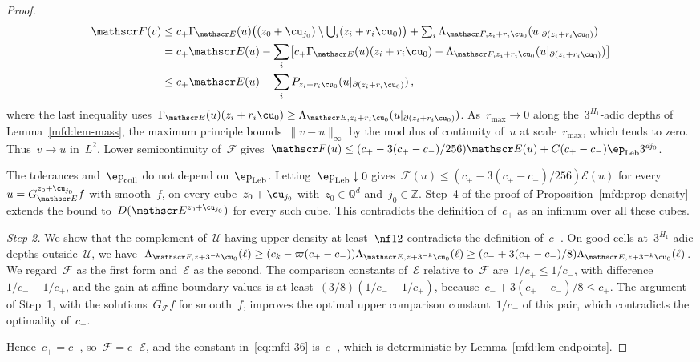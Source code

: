 \documentclass[11pt]{amsart}
\begin{document}
\begin{proof}
\begin{align*}
	\mathscr F(v)
	&\leq c_+\Gamma_{\mathscr E}(u)\bigl((z_0+\cu_{j_0})\setminus\textstyle\bigcup_i(z_i+r_i\cu_0)\bigr)+\sum_i\Lambda_{\mathscr F,z_i+r_i\cu_0}(u|_{\partial(z_i+r_i\cu_0)})
	\notag \\ &
	=c_+\mathscr E(u)-\sum_i\bigl[c_+\Gamma_{\mathscr E}(u)(z_i+r_i\cu_0)-\Lambda_{\mathscr F,z_i+r_i\cu_0}(u|_{\partial(z_i+r_i\cu_0)})\bigr]\\ &
	\leq c_+\mathscr E(u)-\sum_iP_{z_i+r_i\cu_0}(u|_{\partial(z_i+r_i\cu_0)})\,,
\end{align*}
where the last inequality uses~$\Gamma_{\mathscr E}(u)(z_i+r_i\cu_0)\geq \Lambda_{\mathscr E,z_i+r_i\cu_0}(u|_{\partial(z_i+r_i\cu_0)})$. As~$r_{\max}\to0$ along the~$3^{H_1}$-adic depths of Lemma~\ref{mfd:lem-mass}, the maximum principle bounds~$\|v-u\|_\infty$ by the modulus of continuity of~$u$ at scale~$r_{\max}$, which tends to zero. Thus~$v\to u$ in~$L^2$. Lower semicontinuity of~$\mathscr F$ gives~$\mathscr F(u)\leq(c_+-3(c_+-c_-)/256)\mathscr E(u)+C(c_+-c_-)\ep_{\rm Leb}3^{dj_0}$.

\smallskip

The tolerances and~$\ep_{\rm coll}$ do not depend on~$\ep_{\rm Leb}$. Letting~$\ep_{\rm Leb}\downarrow0$ gives~$\mathscr F(u)\leq(c_+-3(c_+-c_-)/256)\mathscr E(u)$ for every~$u=G_{\mathscr E}^{z_0+\cu_{j_0}}f$ with smooth~$f$, on every cube~$z_0+\cu_{j_0}$ with~$z_0\in\mathbb Q^d$ and~$j_0\in\mathbb Z$. Step~4 of the proof of Proposition~\ref{mfd:prop-density} extends the bound to~$D(\mathscr E^{z_0+\cu_{j_0}})$ for every such cube. This contradicts the definition of~$c_+$ as an infimum over all these cubes.

\smallskip

\emph{Step 2.} We show that the complement of~$\mathcal U$ having upper density at least~$\nf12$ contradicts the definition of~$c_-$. On good cells at~$3^{H_1}$-adic depths outside~$\mathcal U$, we have~$\Lambda_{\mathscr F,z+3^{-k}\cu_0}(\ell)\geq(c_k-\varpi(c_+-c_-))\Lambda_{\mathscr E,z+3^{-k}\cu_0}(\ell)\geq(c_-+3(c_+-c_-)/8)\Lambda_{\mathscr E,z+3^{-k}\cu_0}(\ell)$. We regard~$\mathscr F$ as the first form and~$\mathscr E$ as the second. The comparison constants of~$\mathscr E$ relative to~$\mathscr F$ are~$1/c_+\leq1/c_-$, with difference~$1/c_--1/c_+$, and the gain at affine boundary values is at least~$(3/8)(1/c_--1/c_+)$, because~$c_-+3(c_+-c_-)/8\leq c_+$. The argument of Step~1, with the solutions~$G_{\mathscr F}f$ for smooth~$f$, improves the optimal upper comparison constant~$1/c_-$ of this pair, which contradicts the optimality of~$c_-$.

\smallskip

Hence~$c_+=c_-$, so~$\mathscr F=c_-\mathscr E$, and the constant in~\eqref{eq:mfd-36} is~$c_-$, which is deterministic by Lemma~\ref{mfd:lem-endpoints}.
\end{proof}
\end{document}
